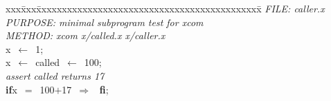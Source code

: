 \documentclass{report}
\begin{document}
\pagestyle{empty}
\begin{tabbing}
xxx\=xxx\=xxxxxxxxxxxxxxxxxxxxxxxxxxxxxxxxxxxxxxxxxxxx\=\kill
{\tt{}}{\em{} FILE:    caller.x
}\\
{\tt{}}{\em{} PURPOSE: minimal subprogram test for xcom
}\\
{\tt{}}{\em{} METHOD:  xcom x/called.x x/caller.x
}\\
x\ $\leftarrow$\ 1;\\
x\ $\leftarrow$\ called\ $\leftarrow$\ 100;\\
{\tt{}}{\em{} assert called returns 17
}\\
{\bf if}\>x\ $=$\ 100$+$17\ $\Rightarrow$
\ {\bf {f}{i}};
\\
\end{tabbing}
\end{document}
